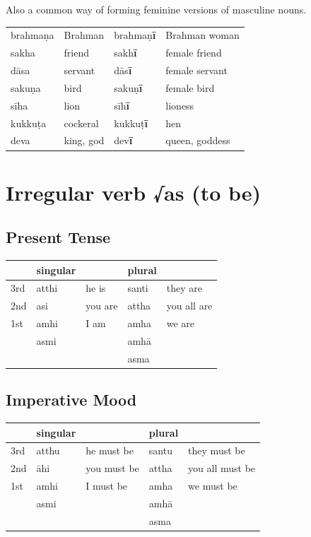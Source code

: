 \documentclass[11pt,oneside]{memoir}
\begin{document}
Also a common way of forming feminine versions of masculine nouns.

\begin{center}
\begin{tabular}{llll}
brahmaṇa & Brahman & brahmaṇ\textbf{ī} & Brahman woman\\
sakha & friend & sakh\textbf{ī} & female friend\\
dāsa & servant & dās\textbf{ī} & female servant\\
sakuṇa & bird & sakuṇ\textbf{ī} & female bird\\
sīha & lion & sīh\textbf{ī} & lioness\\
kukkuṭa & cockeral & kukkuṭ\textbf{ī} & hen\\
deva & king, god & dev\textbf{ī} & queen, goddess\\
\end{tabular}
\end{center}

\clearpage
\section{Irregular verb √as (to be)}
\label{sec:orga2417bf}
\subsection{Present Tense}
\label{sec:orgdf3f3ad}

\begin{center}
\begin{tabular}{lllll}
 & singular &  & plural & \\
\hline
3rd & atthi & he is & santi & they are\\
2nd & asi & you are & attha & you all are\\
1st & amhi & I am & amha & we are\\
 & asmi &  & amhā & \\
 &  &  & asma & \\
\end{tabular}
\end{center}
\subsection{Imperative Mood}
\label{sec:org8bd8224}

\begin{center}
\begin{tabular}{lllll}
 & singular &  & plural & \\
\hline
3rd & atthu & he must be & santu & they must be\\
2nd & āhi & you must be & attha & you all must be\\
1st & amhi & I must be & amha & we must be\\
 & asmi &  & amhā & \\
 &  &  & asma & \\
\end{tabular}
\end{center}
\end{document}
